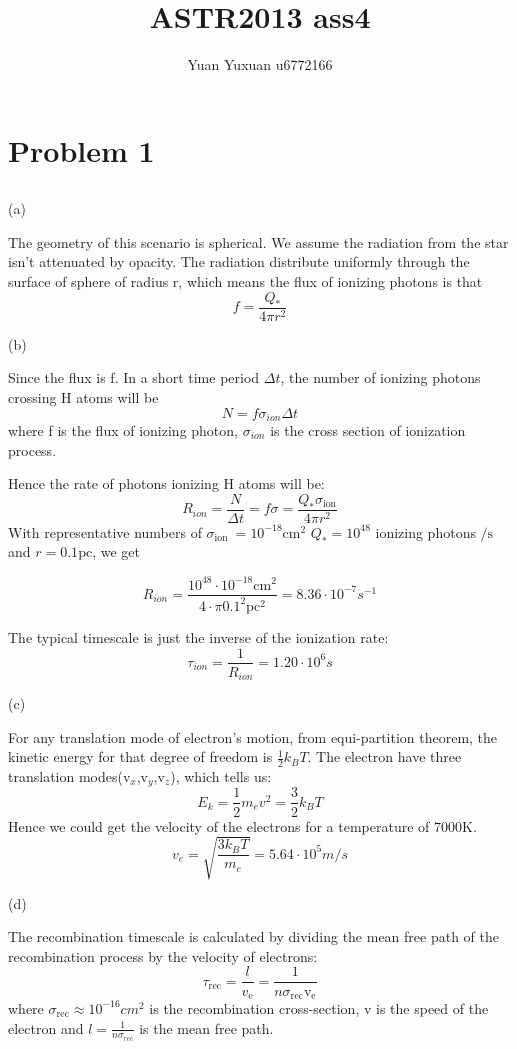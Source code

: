\documentclass{article}
\title{ASTR2013 ass4}
\author{{Yuan Yuxuan  u6772166}}
\begin{document}
\maketitle



\section{Problem 1}
\subsection{}
(a)

The geometry of this scenario is spherical. We assume the radiation from the star isn't attenuated by opacity. The radiation distribute uniformly through the surface of sphere of radius r, which means the flux of ionizing photons is that
$$
f = \frac{Q_*}{4 \pi r^2}
$$

(b)

Since the flux is f. In a short time period $\Delta t$, the number of ionizing photons crossing H atoms will be 
$$
N = f \sigma_{ion} \Delta t
$$
where f is the flux of ionizing photon, $\sigma_{ion}$ is the cross section of ionization process.

Hence the rate of photons ionizing H atoms will be:
$$
R_{ion} = \frac{N}{\Delta t} = f \sigma = \frac{Q_* \sigma_{\mathrm{ion}}}{4 \pi r^2} 
$$
With representative numbers of $\sigma_{\text {ion }}=10^{-18} \mathrm{cm}^{2}$
$Q_{*}=10^{48}$ ionizing photons $/ \mathrm{s}$ and $r=0.1 \mathrm{pc}$, we get 

$$
R_{ion} = \frac{10^{48} \cdot 10^{-18} \mathrm{cm}^2}{4\cdot \pi 0.1^2 \mathrm{pc}^2} = 8.36\cdot10^{-7} s^{-1}
$$

The typical timescale is just the inverse of the ionization rate:
$$
\tau_{ion} = \frac{1}{R_{ion}} = 1.20 \cdot 10^6 s
$$

(c)

For any translation mode of electron's motion, from equi-partition theorem, the kinetic energy for that degree of freedom is $\frac{1}{2} k_B T$. The electron have three translation modes(v$_x$,v$_y$,v$_z$), which tells us:
$$
E_k = \frac{1}{2}m_e v^2 = \frac{3}{2} k_B T
$$
Hence we could get the velocity of the electrons for a temperature of 7000K.
$$
v_e = \sqrt{\frac{3 k_B T}{m_e}} = 5.64\cdot 10^5m/s
$$

(d)

The recombination timescale is calculated by dividing the mean free path of the recombination process by the velocity of electrons:
$$
\tau_{\mathrm{rec}}=\frac{l}{v_{\mathrm{e}}}=\frac{1}{n \sigma_{\mathrm{rec}} \mathrm{v}_{\mathrm{e}}}
$$
where $\sigma_{\mathrm{rec}} \approx 10^{-16} cm^2 $ is the recombination cross-section, v is the speed of the electron and $l = \frac{1}{n \sigma_{rec}}$ is the mean free path.
\end{document}
